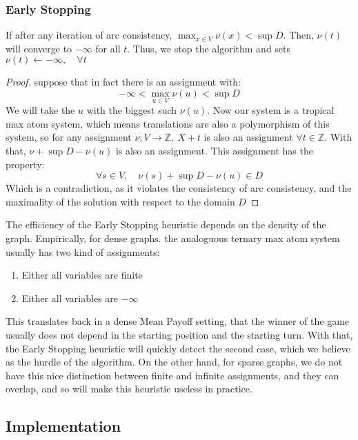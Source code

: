 \subsubsection{Early Stopping}
If after any iteration of arc consistency, $\max_{x\in V}\nu(x) < \sup D.$ Then, $\nu(t)$ will converge to $-\infty$ for all $t.$ 
\newline Thus, we stop the algorithm and sets $\nu(t)\leftarrow -\infty,\quad \forall t$
\begin{proof} 
suppose that in fact there is an assignment with: 
$$
-\infty < \max_{u\in V}\nu(u) < \sup D$$
We will take the $u$ with the biggest such $\nu(u).$  
\newline Now our system is a tropical max atom system, which means translations are also a polymorphism of this system, so for any assignment $\nu:V\rightarrow\mathbb{Z},\ X+t$ is also an assignment $\forall t\in \mathbb{Z}.$ With that, $\nu+\sup D-\nu(u)$ is also an assignment.
\newline This assignment has the property: $$
\forall s\in V,\quad \nu(s)+\sup D-\nu(u) \in D
$$
Which is a contradiction, as it violates the consistency of arc consistency, and the maximality of the solution with respect to the domain $D$
\end{proof}
  
The efficiency of the Early Stopping heuristic depends on the density of the graph. Empirically, for dense graphs. the analoguous ternary max atom system usually has two kind of assignments:
\begin{enumerate}
	\item Either all variables are finite
	\item Either all variables are $-\infty$
\end{enumerate}
This translates back in a dense Mean Payoff setting, that the winner of the game usually does not depend in the starting position and the starting turn. 
\newline With that, the Early Stopping heuristic will quickly detect the second case, which we believe as the hurdle of the algorithm.
\newline On the other hand, for sparse graphs, we do not have this nice distinction between finite and infinite assignments, and they can overlap, and so will make this heuristic useless in practice.

\subsection{Implementation}
